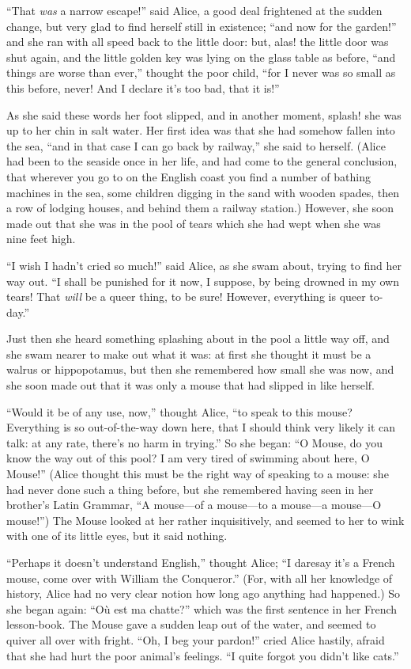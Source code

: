 \documentclass[11pt,openany,oneside]{book}
\begin{document}
“That {\em was\/} a narrow escape!” said Alice, a good deal frightened at the sudden change, but very glad to find herself still in existence; “and now for the garden!” and she ran with all speed back to the little door: but, alas! the little door was shut again, and the little golden key was lying on the glass table as before, “and things are worse than ever,” thought the poor child, “for I never was so small as this before, never! And I declare it’s too bad, that it is!” 

As she said these words her foot slipped, and in another moment, splash! she was up to her chin in salt water. Her first idea was that she had somehow fallen into the sea, “and in that case I can go back by railway,” she said to herself. (Alice had been to the seaside once in her life, and had come to the general conclusion, that wherever you go to on the English coast you find a number of bathing machines in the sea, some children digging in the sand with wooden spades, then a row of lodging houses, and behind them a railway station.) However, she soon made out that she was in the pool of tears which she had wept when she was nine feet high. 

“I wish I hadn’t cried so much!” said Alice, as she swam about, trying to find her way out. “I shall be punished for it now, I suppose, by being drowned in my own tears! That {\em will\/} be a queer thing, to be sure! However, everything is queer to-day.” 

Just then she heard something splashing about in the pool a little way off, and she swam nearer to make out what it was: at first she thought it must be a walrus or hippopotamus, but then she remembered how small she was now, and she soon made out that it was only a mouse that had slipped in like herself. 

“Would it be of any use, now,” thought Alice, “to speak to this mouse? Everything is so out-of-the-way down here, that I should think very likely it can talk: at any rate, there’s no harm in trying.” So she began: “O Mouse, do you know the way out of this pool? I am very tired of swimming about here, O Mouse!” (Alice thought this must be the right way of speaking to a mouse: she had never done such a thing before, but she remembered having seen in her brother’s Latin Grammar, “A mouse—of a mouse—to a mouse—a mouse—O mouse!”) The Mouse looked at her rather inquisitively, and seemed to her to wink with one of its little eyes, but it said nothing. 

“Perhaps it doesn’t understand English,” thought Alice; “I daresay it’s a French mouse, come over with William the Conqueror.” (For, with all her knowledge of history, Alice had no very clear notion how long ago anything had happened.) So she began again: “Où est ma chatte?” which was the first sentence in her French lesson-book. The Mouse gave a sudden leap out of the water, and seemed to quiver all over with fright. “Oh, I beg your pardon!” cried Alice hastily, afraid that she had hurt the poor animal’s feelings. “I quite forgot you didn’t like cats.” 
\end{document}
